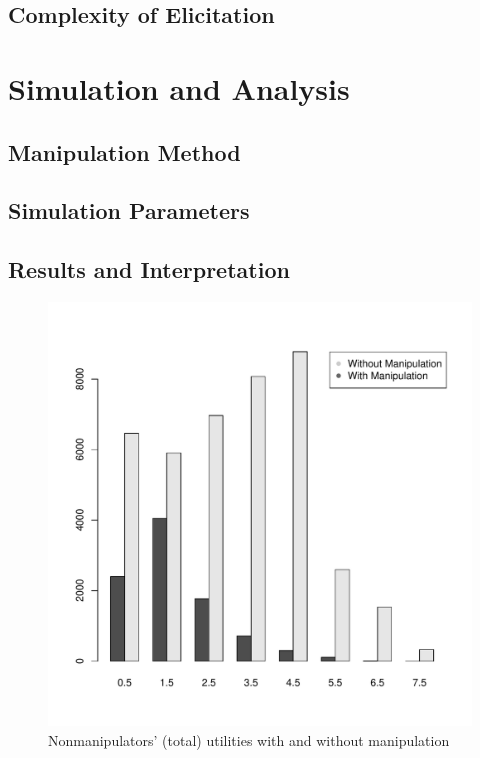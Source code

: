 \documentclass[12pt,letterpaper]{article} %
\begin{document}
\subsection{Complexity of Elicitation}


\section{Simulation and Analysis}


\subsection{Manipulation Method}

\subsection{Simulation Parameters}

\subsection{Results and Interpretation}



\begin{figure}
\begin{center}
\includegraphics[scale=0.3]{../graphics/nonmanipulators-utilities.pdf}
\caption{Nonmanipulators' (total) utilities with and without manipulation}
\end{center}
\end{figure}
\end{document}
